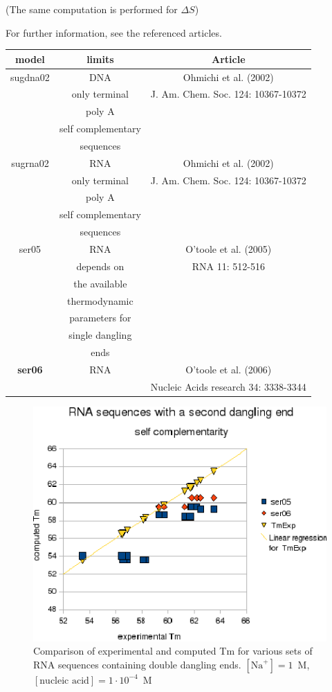 \documentclass{article}
\begin{document}
       (The same computation is performed for $\Delta S$)

For further information, see the referenced articles.

\begin{table}[hc]
\begin{tabular}[h]{| c | c | c |}
\textbf{model} & \textbf{limits} & \textbf{Article} \\
\hline
sugdna02 & DNA & Ohmichi et al. (2002)\\
 & only terminal & J. Am. Chem. Soc. 124: 10367-10372 \\
 & poly A & \\
 & self complementary & \\
 & sequences & \\
 \hline
sugrna02 & RNA & Ohmichi et al. (2002)\\
 & only terminal & J. Am. Chem. Soc. 124: 10367-10372 \\
 & poly A & \\
 & self complementary & \\
 & sequences & \\
 \hline
ser05 & RNA & O'toole et al. (2005)\\
 & depends on & RNA 11: 512-516 \\
 & the available & \\
 & thermodynamic & \\
 & parameters for & \\
 & single dangling & \\
 & ends & \\
 \hline
\textbf{ser06} & RNA & O'toole et al. (2006)\\
 & & Nucleic Acids research 34: 3338-3344 \\
\hline
\end{tabular}
\end{table}

\begin{figure}[h]
\includegraphics[width=1\linewidth]{images/RNASecondDanglingEnd}
\caption{Comparison of experimental and computed Tm for various sets of
 RNA sequences containing double dangling ends. $[\mbox{Na}^+] = 1$~M, $[\mbox{nucleic acid}] = 1\cdot{}10^{-4}$~M}
\end{figure}
\end{document}
